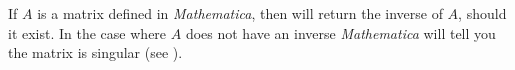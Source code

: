 If $A$ is a matrix defined in {\sl Mathematica}, then  will return the inverse of $A$, should it exist.  In the case where $A$ does not have an inverse {\sl Mathematica} will tell you the matrix is singular (see ).